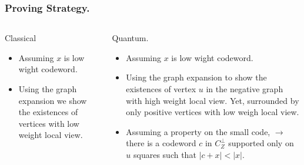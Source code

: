\documentclass[usenames, aspectratio=169]{beamer}
\theoremstyle{claim}
\theoremstyle{remark}
\begin{document}
\begin{frame}
  \frametitle{ Proving Strategy. }
  \begin{columns}[t]
\begin{column}{0.5\textwidth}

  \begin{block}{Classical}
    \begin{itemize}%
      \item Assuming $x$ is low wight codeword. 
      \item Using the graph expansion we show the existences of vertices with low weight local view.  
    \end{itemize}
\end{block}

\end{column}
    \begin{column}{0.5\textwidth}
      \begin{block}{Quantum.}
      \begin{itemize}%
        \item Assuming $x$ is low wight codeword. 
        \item  Using the graph expansion to show the existences of vertex $u$ in the negative graph with high weight local view. Yet, surrounded by only positive vertices with low weigh local view. 
        \item Assuming a property on the small code, $\rightarrow$ there is a codeword $c$ in $C_{Z}^{\perp}$ supported only on $u$ squares such that $|c + x| < |x|$. 
      \end{itemize} 
    \end{block}
\end{column}
\end{columns}

\end{frame}

\end{document}
